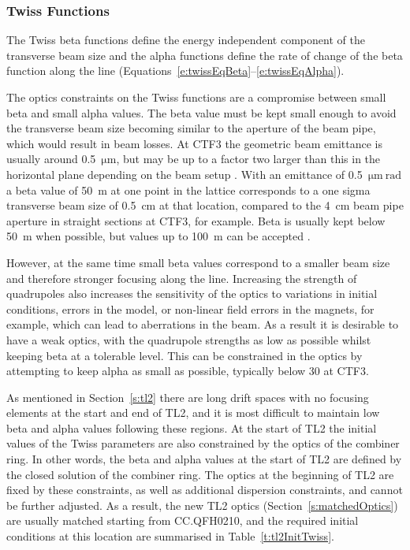 \subsubsection{Twiss Functions}


The Twiss beta functions define the energy independent component of the transverse beam size and the alpha functions define the rate of change of the beta function along the line (Equations~\ref{e:twissEqBeta}--\ref{e:twissEqAlpha}). %

The optics constraints on the Twiss functions are a compromise between small beta and small alpha values. The beta value must be kept small enough to avoid the transverse beam size becoming similar to the aperture of the beam pipe, which would result in beam losses. At CTF3 the geometric beam emittance is usually around 0.5~\(\mathrm{\mu m}\), but may be up to a factor two larger than this in the horizontal plane depending on the beam setup \cite{davideThesis}. With an emittance of 0.5~\(\mathrm{\mu m~rad}\) a beta value of 50~m at one point in the lattice corresponds to a one sigma transverse beam size of 0.5~cm at that location, compared to the 4~cm beam pipe aperture in straight sections at CTF3, for example. Beta is usually kept below 50~m when possible, but values up to 100~m can be accepted \cite{piotrPriv}. 

However, at the same time small beta values correspond to a smaller beam size and therefore stronger focusing along the line. Increasing the strength of quadrupoles also increases the sensitivity of the optics to variations in initial conditions, errors in the model, or non-linear field errors in the magnets, for example, which can lead to aberrations in the beam. As a result it is desirable to have a weak optics, with the quadrupole strengths as low as possible whilst keeping beta at a tolerable level. This can be constrained in the optics by attempting to keep alpha as small as possible, typically below 30 at CTF3.

As mentioned in Section~\ref{s:tl2} there are long drift spaces with no focusing elements at the start and end of TL2, and it is most difficult to maintain low beta and alpha values following these regions. At the start of TL2 the initial values of the Twiss parameters are also constrained by the optics of the combiner ring. In other words, the beta and alpha values at the start of TL2 are defined by the closed solution of the combiner ring. The optics at the beginning of TL2 are fixed by these constraints, as well as additional dispersion constraints, and cannot be further adjusted. As a result, the new TL2 optics (Section~\ref{s:matchedOptics}) are usually matched starting from CC.QFH0210, and the required initial conditions at this location are summarised in Table~\ref{t:tl2InitTwiss}.

